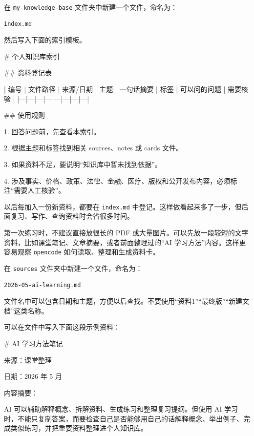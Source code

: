 \begin{tcolorbox}[stepbox,title=操作 3：创建知识库总索引]
在 \texttt{my-knowledge-base} 文件夹中新建一个文件，命名为：

\begin{verbatim}
index.md
\end{verbatim}

然后写入下面的索引模板。
\end{tcolorbox}

\begin{tcolorbox}[filebox,title=index.md 示例]
\# 个人知识库索引

\#\# 资料登记表

| 编号 | 文件路径 | 来源/日期 | 主题 | 一句话摘要 | 标签 | 可以问的问题 | 需要核验 |
|---|---|---|---|---|---|---|---|

\#\# 使用规则

1. 回答问题前，先查看本索引。

2. 根据主题和标签找到相关 sources、notes 或 cards 文件。

3. 如果资料不足，要说明“知识库中暂未找到依据”。

4. 涉及事实、价格、政策、法律、金融、医疗、版权和公开发布内容，必须标注“需要人工核验”。
\end{tcolorbox}

以后每加入一份新资料，都要在 \texttt{index.md} 中登记。这样做看起来多了一步，但后面复习、写作、查询资料时会省很多时间。


第一次练习时，不建议直接放很长的 PDF 或大量图片。可以先放一段较短的文字资料，比如课堂笔记、文章摘要，或者前面整理过的“AI 学习方法”内容。这样更容易观察 \texttt{opencode} 如何读取、整理和生成资料卡。

\begin{tcolorbox}[stepbox,title=操作 4：保存第一份资料]
在 \texttt{sources} 文件夹中新建一个文件，命名为：

\begin{verbatim}
2026-05-ai-learning.md
\end{verbatim}

文件名中可以包含日期和主题，方便以后查找。不要使用“资料1”“最终版”“新建文档”这类名称。
\end{tcolorbox}

可以在文件中写入下面这段示例资料：

\begin{tcolorbox}[filebox,title=sources/2026-05-ai-learning.md 示例]
\# AI 学习方法笔记

来源：课堂整理

日期：2026 年 5 月

内容摘要：

AI 可以辅助解释概念、拆解资料、生成练习和整理复习提纲。但使用 AI 学习时，不能只复制答案，而要检查自己是否能够用自己的话解释概念、举出例子、完成类似练习，并把重要资料整理进个人知识库。
\end{tcolorbox}

